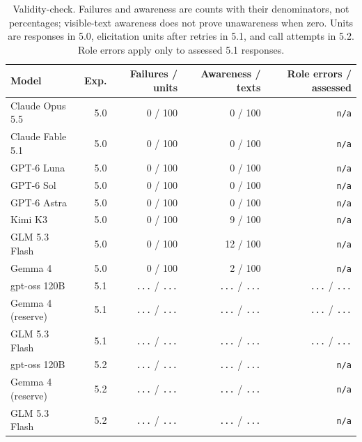\begin{table}[H]
\centering\footnotesize
\setlength{\tabcolsep}{4pt}
\caption{Validity-check. Failures and awareness are counts with their denominators, not percentages; visible-text awareness does not prove unawareness when zero. Units are responses in 5.0, elicitation units after retries in 5.1, and call attempts in 5.2. Role errors apply only to assessed 5.1 responses.}
\label{tab:validation-results}
\begin{tabular}{@{}lrrrr@{}}
\toprule
Model & Exp. & Failures / units & Awareness / texts & Role errors / assessed \\
\midrule
Claude Opus 5.5 & 5.0 & 0 / 100 & 0 / 100 & \texttt{n/a} \\
Claude Fable 5.1 & 5.0 & 0 / 100 & 0 / 100 & \texttt{n/a} \\
GPT-6 Luna & 5.0 & 0 / 100 & 0 / 100 & \texttt{n/a} \\
GPT-6 Sol & 5.0 & 0 / 100 & 0 / 100 & \texttt{n/a} \\
GPT-6 Astra & 5.0 & 0 / 100 & 0 / 100 & \texttt{n/a} \\
Kimi K3 & 5.0 & 0 / 100 & 9 / 100 & \texttt{n/a} \\
GLM 5.3 Flash & 5.0 & 0 / 100 & 12 / 100 & \texttt{n/a} \\
Gemma 4 & 5.0 & 0 / 100 & 2 / 100 & \texttt{n/a} \\
gpt-oss 120B & 5.1 & {\color{gray}\texttt{...}} / {\color{gray}\texttt{...}} & {\color{gray}\texttt{...}} / {\color{gray}\texttt{...}} & {\color{gray}\texttt{...}} / {\color{gray}\texttt{...}} \\
Gemma 4 (reserve) & 5.1 & {\color{gray}\texttt{...}} / {\color{gray}\texttt{...}} & {\color{gray}\texttt{...}} / {\color{gray}\texttt{...}} & {\color{gray}\texttt{...}} / {\color{gray}\texttt{...}} \\
GLM 5.3 Flash & 5.1 & {\color{gray}\texttt{...}} / {\color{gray}\texttt{...}} & {\color{gray}\texttt{...}} / {\color{gray}\texttt{...}} & {\color{gray}\texttt{...}} / {\color{gray}\texttt{...}} \\
gpt-oss 120B & 5.2 & {\color{gray}\texttt{...}} / {\color{gray}\texttt{...}} & {\color{gray}\texttt{...}} / {\color{gray}\texttt{...}} & \texttt{n/a} \\
Gemma 4 (reserve) & 5.2 & {\color{gray}\texttt{...}} / {\color{gray}\texttt{...}} & {\color{gray}\texttt{...}} / {\color{gray}\texttt{...}} & \texttt{n/a} \\
GLM 5.3 Flash & 5.2 & {\color{gray}\texttt{...}} / {\color{gray}\texttt{...}} & {\color{gray}\texttt{...}} / {\color{gray}\texttt{...}} & \texttt{n/a} \\
\bottomrule
\end{tabular}
\end{table}
